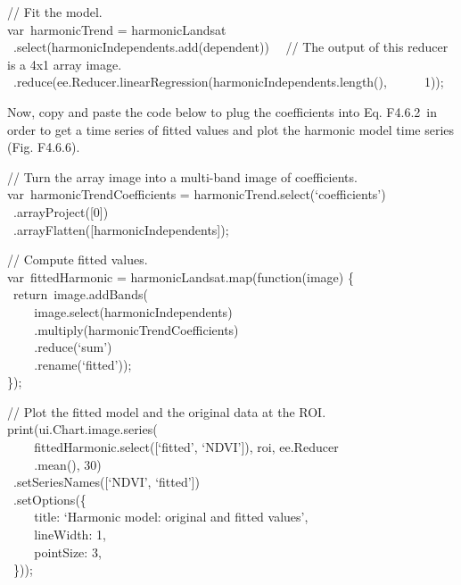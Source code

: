 \documentclass[
  letterpaper,
  DIV=11,
  numbers=noendperiod]{scrreprt}
\begin{document}
// Fit the model.\\
var~harmonicTrend = harmonicLandsat\\
\hspace*{0.333em} ~.select(harmonicIndependents.add(dependent))~ ~// The
output of this reducer is a 4x1 array image.~
~.reduce(ee.Reducer.linearRegression(harmonicIndependents.length(),~ ~ ~
~1));

Now, copy and paste the code below to plug the coefficients into Eq.
F4.6.2~in order to get a time series of fitted values and plot the
harmonic model time series (Fig. F4.6.6).

// Turn the array image into a multi-band image of coefficients.\\
var~harmonicTrendCoefficients = harmonicTrend.select(`coefficients')\\
\hspace*{0.333em} ~.arrayProject({[}0{]})\\
\hspace*{0.333em} ~.arrayFlatten({[}harmonicIndependents{]});

// Compute fitted values.\\
var~fittedHarmonic = harmonicLandsat.map(function(image) \{~
~return~image.addBands(\\
\hspace*{0.333em} ~ ~ ~image.select(harmonicIndependents)\\
\hspace*{0.333em} ~ ~ ~.multiply(harmonicTrendCoefficients)\\
\hspace*{0.333em} ~ ~ ~.reduce(`sum')\\
\hspace*{0.333em} ~ ~ ~.rename(`fitted'));\\
\});

// Plot the fitted model and the original data at the ROI.\\
print(ui.Chart.image.series(\\
\hspace*{0.333em} ~ ~ ~fittedHarmonic.select({[}`fitted', `NDVI'{]}),
roi, ee.Reducer\\
\hspace*{0.333em} ~ ~ ~.mean(), 30)\\
\hspace*{0.333em} ~.setSeriesNames({[}`NDVI', `fitted'{]})\\
\hspace*{0.333em} ~.setOptions(\{\\
\hspace*{0.333em} ~ ~ ~title: `Harmonic model: original and fitted
values',\\
\hspace*{0.333em} ~ ~ ~lineWidth: 1,\\
\hspace*{0.333em} ~ ~ ~pointSize: 3,\\
\hspace*{0.333em} ~\}));
\end{document}
